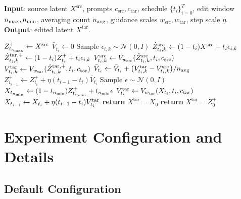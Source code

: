 \begin{algorithm}[t]
    \caption{\textbf{Full \methodplus algorithm}}
    \label{alg:EchoEditPlusFull}
    \textbf{Input}: source latent $X^{\mathrm{src}}$, prompts $c_{\mathrm{src}},c_{\mathrm{tar}}$, schedule $\{t_i\}_{i=0}^{T}$, edit window $n_{\max},n_{\min}$, averaging count $n_{\mathrm{avg}}$, guidance scales $w_{\mathrm{src}},w_{\mathrm{tar}}$, step scale $\eta$.\\
    \textbf{Output}: edited latent $X^{\mathrm{tar}}$.
    \begin{algorithmic}[1]
    \State $Z^{+}_{t_{n_{\max}}}\leftarrow X^{\mathrm{src}}$
        \State $\bar{V}_{t_i}\leftarrow 0$
            \State Sample $\epsilon_{i,k}\sim\mathcal{N}(0,I)$
            \State $\hat{Z}^{\mathrm{src}}_{t_i,k}\leftarrow (1-t_i)X^{\mathrm{src}}+t_i\epsilon_{i,k}$
            \State $\hat{Z}^{\mathrm{tar},+}_{t_i,k}\leftarrow (1-t_i)Z^{+}_{t_i}+t_i\epsilon_{i,k}$
            \State $V^{\mathrm{src}}_{t_i,k}\leftarrow V_{w_{\mathrm{src}}}(\hat{Z}^{\mathrm{src}}_{t_i,k},t_i,c_{\mathrm{src}})$
            \State $V^{\mathrm{tar}}_{t_i,k}\leftarrow V_{w_{\mathrm{tar}}}(\hat{Z}^{\mathrm{tar},+}_{t_i,k},t_i,c_{\mathrm{tar}})$
            \State $\bar{V}_{t_i}\leftarrow \bar{V}_{t_i}+\big(V^{\mathrm{tar}}_{t_i,k}-V^{\mathrm{src}}_{t_i,k}\big)/n_{\mathrm{avg}}$
        \EndFor
        \State $Z^{+}_{t_{i-1}}\leftarrow Z^{+}_{t_i}+\eta(t_{i-1}-t_i)\bar{V}_{t_i}$
    \EndFor
        \State Sample $\epsilon\sim\mathcal{N}(0,I)$
        \State $X_{t_{n_{\min}}}\leftarrow (1-t_{n_{\min}})Z^{+}_{t_{n_{\min}}}+t_{n_{\min}}\epsilon$
            \State $V^{\mathrm{tar}}_{t_i}\leftarrow V_{w_{\mathrm{tar}}}(X_{t_i},t_i,c_{\mathrm{tar}})$
            \State $X_{t_{i-1}}\leftarrow X_{t_i}+\eta(t_{i-1}-t_i)V^{\mathrm{tar}}_{t_i}$
        \EndFor
        \State \textbf{return} $X^{\mathrm{tar}}=X_{0}$
    \Else
        \State \textbf{return} $X^{\mathrm{tar}}=Z^{+}_{0}$
    \EndIf
    \end{algorithmic}
\end{algorithm}

\section{Experiment Configuration and Details}
\label{app:exp_config}

\subsection{Default Configuration}

